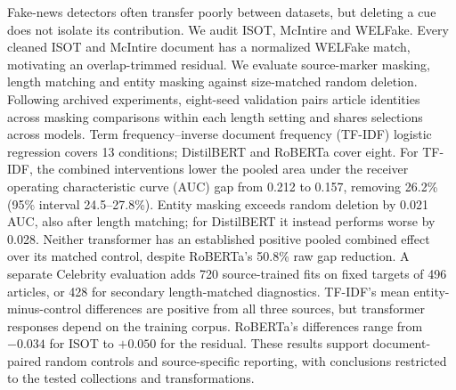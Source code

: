 Fake-news detectors often transfer poorly between datasets, but deleting a cue does not isolate its contribution. We audit ISOT, McIntire and WELFake. Every cleaned ISOT and McIntire document has a normalized WELFake match, motivating an overlap-trimmed residual. We evaluate source-marker masking, length matching and entity masking against size-matched random deletion. Following archived experiments, eight-seed validation pairs article identities across masking comparisons within each length setting and shares selections across models. Term frequency--inverse document frequency (TF-IDF) logistic regression covers 13 conditions; DistilBERT and RoBERTa cover eight. For TF-IDF, the combined interventions lower the pooled area under the receiver operating characteristic curve (AUC) gap from 0.212 to 0.157, removing 26.2\% (95\% interval 24.5--27.8\%). Entity masking exceeds random deletion by 0.021 AUC, also after length matching; for DistilBERT it instead performs worse by 0.028. Neither transformer has an established positive pooled combined effect over its matched control, despite RoBERTa's 50.8\% raw gap reduction. A separate Celebrity evaluation adds 720 source-trained fits on fixed targets of 496 articles, or 428 for secondary length-matched diagnostics. TF-IDF's mean entity-minus-control differences are positive from all three sources, but transformer responses depend on the training corpus. RoBERTa's differences range from $-0.034$ for ISOT to $+0.050$ for the residual. These results support document-paired random controls and source-specific reporting, with conclusions restricted to the tested collections and transformations.
